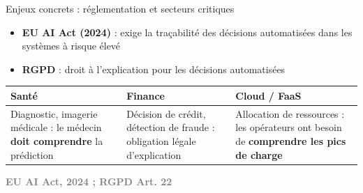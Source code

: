 \documentclass[10pt]{beamer}
\newcommand{\source}[1]{\vspace{6pt}\hfill{\textcolor{gray}{\textbf{\tiny #1}}}}
\begin{document}
\begin{frame}{Enjeux concrets : réglementation et secteurs critiques}
	\begin{tcolorbox}[title=Réglementation]
		\begin{itemize}
			\item \textbf{EU AI Act (2024)} : exige la traçabilité des décisions automatisées
			dans les systèmes à risque élevé
			\item \textbf{RGPD} : droit à l'explication pour les décisions automatisées
		\end{itemize}
	\end{tcolorbox}
	
	\vspace{6pt}
	
	\begin{tabular}{p{}p{}p{}}
		\hline
		\textbf{Santé} & \textbf{Finance} & \textbf{Cloud / FaaS} \\
		\hline
		Diagnostic, imagerie médicale : le médecin \textbf{doit comprendre} la prédiction &
		Décision de crédit, détection de fraude : obligation légale d'explication &
		Allocation de ressources : les opérateurs ont besoin de \textbf{comprendre les pics de charge} \\
		\hline
	\end{tabular}
	
	\vspace{8pt}
	\source{EU AI Act, 2024 ; RGPD Art. 22}
\end{frame}
\end{document}
